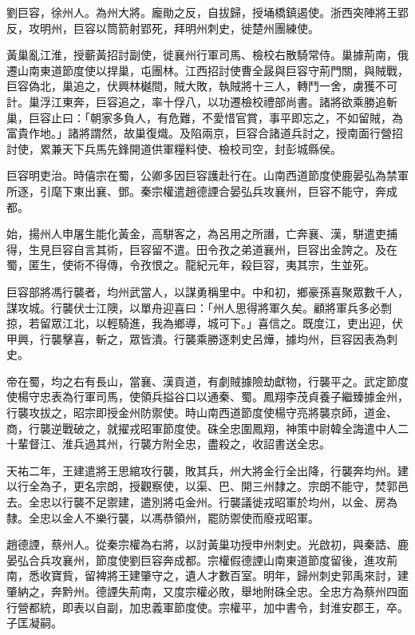 \begin{pinyinscope}
 劉巨容，徐州人。為州大將。龐勛之反，自拔歸，授埇橋鎮遏使。浙西突陣將王郢反，攻明州，巨容以筒箭射郢死，拜明州刺史，徙楚州團練使。



 黃巢亂江淮，授蘄黃招討副使，徙襄州行軍司馬、檢校右散騎常侍。巢據荊南，俄遷山南東道節度使以捍巢，屯團林。江西招討使曹全晸與巨容守荊門關，與賊戰，巨容偽北，巢追之，伏興林樾間，賊大敗，執賊將十三人，轉鬥一舍，虜獲不可計。巢浮江東奔，巨容追之，率十俘八，以功遷檢校禮部尚書。諸將欲乘勝追斬巢，巨容止曰：「朝家多負人，有危難，不愛惜官賞，事平即忘之，不如留賊，為富貴作地。」諸將謂然，故巢復熾。及陷兩京，巨容合諸道兵討之，授南面行營招討使，累兼天下兵馬先鋒開道供軍糧料使、檢校司空，封彭城縣侯。



 巨容明吏治。時僖宗在蜀，公卿多因巨容護赴行在。山南西道節度使鹿晏弘為禁軍所逐，引麾下東出襄、鄧。秦宗權遣趙德諲合晏弘兵攻襄州，巨容不能守，奔成都。



 始，揚州人申屠生能化黃金，高駢客之，為呂用之所譖，亡奔襄、漢，駢遣吏捕得，生見巨容自言其術，巨容留不遣。田令孜之弟道襄州，巨容出金誇之。及在蜀，匿生，使術不得傳，令孜恨之。龍紀元年，殺巨容，夷其宗，生並死。



 巨容部將馮行襲者，均州武當人，以謀勇稱里中。中和初，鄉豪孫喜聚眾數千人，謀攻城。行襲伏士江隩，以單舟迎喜曰：「州人思得將軍久矣。顧將軍兵多必剽掠，若留眾江北，以輕騎進，我為鄉導，城可下。」喜信之。既度江，吏出迎，伏甲興，行襲擊喜，斬之，眾皆潰。行襲乘勝逐刺史呂燁，據均州，巨容因表為刺史。



 帝在蜀，均之右有長山，當襄、漢貢道，有劇賊據險劫獻物，行襲平之。武定節度使楊守忠表為行軍司馬，使領兵搤谷口以通秦、蜀。鳳翔李茂貞養子繼臻據金州，行襲攻拔之，昭宗即授金州防禦使。時山南西道節度使楊守亮將襲京師，道金、商，行襲逆戰破之，就擢戎昭軍節度使。硃全忠圍鳳翔，神策中尉韓全誨遣中人二十輩督江、淮兵過其州，行襲方附全忠，盡殺之，收詔書送全忠。



 天祐二年，王建遣將王思綰攻行襲，敗其兵，州大將金行全出降，行襲奔均州。建以行全為子，更名宗朗，授觀察使，以渠、巴、開三州隸之。宗朗不能守，焚郭邑去。全忠以行襲不足禦建，遣別將屯金州。行襲議徙戎昭軍於均州，以金、房為隸。全忠以金人不樂行襲，以馮恭領州，罷防禦使而廢戎昭軍。



 趙德諲，蔡州人。從秦宗權為右將，以討黃巢功授申州刺史。光啟初，與秦誥、鹿晏弘合兵攻襄州，節度使劉巨容奔成都。宗權假德諲山南東道節度留後，進攻荊南，悉收寶貲，留裨將王建肇守之，遺人才數百室。明年，歸州刺史郭禹來討，建肇納之，奔黔州。德諲失荊南，又度宗權必敗，舉地附硃全忠。全忠方為蔡州四面行營都統，即表以自副，加忠義軍節度使。宗權平，加中書令，封淮安郡王，卒。子匡凝嗣。




\end{pinyinscope}
